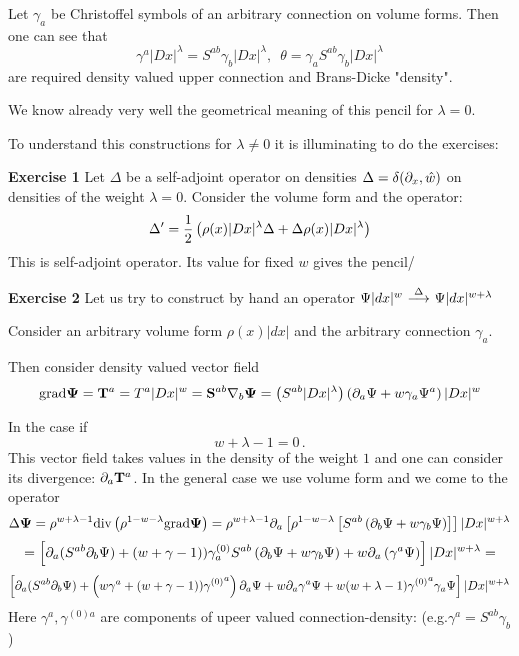 Let $\gamma_a$ be Christoffel symbols of an arbitrary connection on volume forms. Then one can see that
             $$
          \gamma^a|Dx|^\lambda=S^{ab}\gamma_b|Dx|^\lambda,\,\,\, \theta=\gamma_aS^{ab}\gamma_b|Dx|^\lambda
             $$
are required density valued upper connection and Brans-Dicke "density".

We know already very well the geometrical meaning of this pencil for $\lambda=0$.

To understand this constructions for $\lambda\not=0$ it is illuminating to do the exercises:

 {\bf Exercise 1} Let $\Delta$ be a self-adjoint operator on densities $\Delta=\delta(\partial_x, \hat w)$ on densities
  of the weight $\lambda=0$. Consider the volume form and the operator:
                      $$
                  \Delta'={1\over 2}\left(\rho (x)|Dx|^\lambda\Delta+\Delta \rho (x)|Dx|^\lambda\right)
                      $$
This is self-adjoint operator.  Its value for fixed $w$ gives the pencil/
 \medskip

{\bf Exercise 2}  Let us try to construct by hand an operator
$\Psi|dx|^w\,\,{\buildrel \Delta\over \longrightarrow}\,\, \Psi|dx|^{w+\lambda}$


Consider an arbitrary volume form $\rho(x)|dx|$ and the arbitrary connection $\gamma_a$.

Then consider density valued vector field
             $$
  {\bf \rm grad}{\bf \Psi}={\bf T}^a=T^a|Dx|^w=
  {\bf S}^{ab}\nabla_b {\bf \Psi}=\left(S^{ab}|Dx|^\lambda\right)\left(\partial_a\Psi+w\gamma_a\Psi^a\right)|Dx|^w
             $$

  In the case if
              $$
             w+\lambda-1=0\,.
              $$
This vector field takes values in the density of the weight $1$ and one can consider its divergence:
  $\partial_a{\bf T}^a$.
    In the general case we use volume form
    and we come to the operator
             $$
          \Delta {\bf \Psi}= \rho^{w+\lambda-1}{\bf \rm div} \left(\rho^{1-w-\lambda}{\bf \rm grad}{\bf \Psi}\right)=
            \rho^{w+\lambda-1}\partial_a
            \left[
               \rho^{1-w-\lambda}
               \left[
              S^{ab}
              \left(
                \partial_b\Psi+w\gamma_b\Psi
              \right)
               \right]
               \right]|Dx|^{w+\lambda}
             $$
             $$
             =\left[\partial_a(S^{ab}\partial_b\Psi)+
             \left(w+\gamma-1\right))\gamma^{(0)}_aS^{ab}\left(\partial_b\Psi+w\gamma_b\Psi\right)+
                 w\partial_a\left(\gamma^a\Psi\right)\right]|Dx|^{w+\lambda}=
             $$
             $$
\left[\partial_a(S^{ab}\partial_b\Psi)+
             \left( w\gamma^a+
             \left(w+\gamma-1\right)){\gamma^{(0)}}^a\right)\partial_a\Psi+
                 w\partial_a\gamma^a\Psi+
            w(w+\lambda-1){\gamma^{(0)}}^a\gamma_a
                 \Psi\right]|Dx|^{w+\lambda}
             $$
Here $\gamma^a, \gamma^{(0)a}$ are components of upeer valued connection-density:
 (e.g.$\gamma^a=S^{ab}\gamma_b$)


